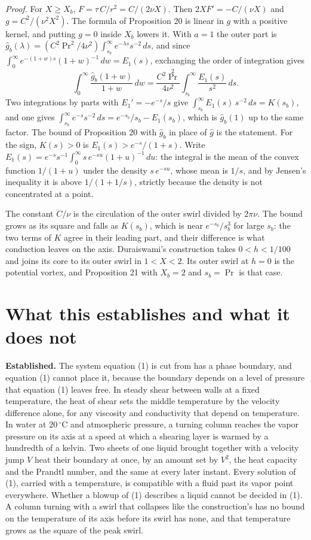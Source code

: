 \emph{Proof.} For $X \ge X_b$, $F = \tau\,C/r^2 = C/(2\nu X)$. Then $2XF' = -C/(\nu X)$ and
$g = C^2/(\nu^2X^2)$. The formula of Proposition 20 is linear in $g$ with a positive kernel, and
putting $g = 0$ inside $X_b$ lowers it. With $a = 1$ the outer part is
$\hat g_b(\lambda) = (C^2\Pr^2/4\nu^2)\int_{s_b}^\infty e^{-\lambda s}s^{-2}\,ds$, and since
$\int_0^\infty e^{-(1+w)s}(1+w)^{-1}\,dw = E_1(s)$, exchanging the order of integration gives
\[
\int_0^\infty \frac{\hat g_b(1+w)}{1+w}\,dw = \frac{C^2\Pr^2}{4\nu^2}\int_{s_b}^\infty
\frac{E_1(s)}{s^2}\,ds .
\]
Two integrations by parts with $E_1' = -e^{-s}/s$ give $\int_{s_b}^\infty E_1(s)\,s^{-2}\,ds =
K(s_b)$, and one gives $\int_{s_b}^\infty e^{-s}s^{-2}\,ds = e^{-s_b}/s_b - E_1(s_b)$, which is
$\hat g_b(1)$ up to the same factor. The bound of Proposition 20 with $\hat g_b$ in place of
$\hat g$ is the statement. For the sign, $K(s) > 0$ is $E_1(s) > e^{-s}/(1+s)$. Write
$E_1(s) = e^{-s}s^{-1}\int_0^\infty s\,e^{-su}(1+u)^{-1}\,du$: the integral is the mean of the
convex function $1/(1+u)$ under the density $s\,e^{-su}$, whose mean is $1/s$, and by Jensen's
inequality it is above $1/(1 + 1/s)$, strictly because the density is not concentrated at a
point. \hfill\qedsymbol

The constant $C/\nu$ is the circulation of the outer swirl divided by $2\pi\nu$. The bound grows
as its square and falls as $K(s_b)$, which is near $e^{-s_b}/s_b^3$ for large $s_b$: the two terms
of $K$ agree in their leading part, and their difference is what conduction leaves on the axis.
Duraiswami's construction takes $0 < h < 1/100$ and joins its core to its outer swirl in
$1 < X < 2$. Its outer swirl at $h = 0$ is the potential vortex, and Proposition 21 with
$X_b = 2$ and $s_b = \Pr$ is that case.

\section{What this establishes and what it does not}

\textbf{Established.} The system equation (1) is cut from has a phase boundary, and equation (1)
cannot place it, because the boundary depends on a level of pressure that equation (1) leaves free.
In steady shear between walls at a fixed temperature, the heat of shear sets the middle temperature
by the velocity difference alone, for any viscosity and conductivity that depend on temperature.
In water at $20\,^\circ$C and atmospheric pressure, a turning column reaches the vapor pressure on
its axis at a speed at which a shearing layer is warmed by a hundredth of a kelvin. Two sheets of
one liquid brought together with a velocity jump $V$ heat their boundary at once, by an amount set
by $V^2$, the heat capacity and the Prandtl number, and the same at every later instant. Every
solution of (1), carried with a temperature, is compatible with a fluid past its vapor point
everywhere. Whether a blowup of (1) describes a liquid cannot be decided in (1). A column turning
with a swirl that collapses like the construction's has no bound on the temperature of its axis
before its swirl has none, and that temperature grows as the square of the peak swirl.

